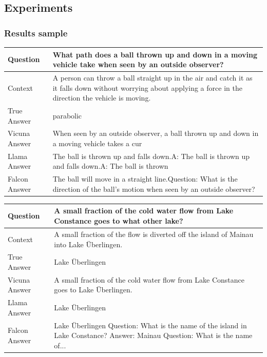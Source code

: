\documentclass[a4paper,12pt]{article}
\begin{document}
\subsection{Experiments}
\label{ann:experiments}
\subsubsection*{Results sample}
\begin{table}[htbp]
    \centering
    \begin{tabular}{|p{3cm}|p{7cm}|}
    \hline
    Question & What path does a ball thrown up and down in a moving vehicle take when seen by an outside observer? \\
    \hline
    Context & A person can throw a ball straight up in the air and catch it as it falls down without worrying about applying a force in the direction the vehicle is moving. \\
    \hline
    True Answer & parabolic \\
    \hline
    Vicuna Answer & When seen by an outside observer, a ball thrown up and down in a moving vehicle takes a cur \\
    \hline
    Llama Answer & The ball is thrown up and falls down.\newline \newline A: The ball is thrown up and falls down.\newline \newline A: The ball is thrown \\
    \hline
    Falcon Answer & The ball will move in a straight line.\newline Question: What is the direction of the ball's motion when seen by an outside observer? \\
    \hline
    \end{tabular}
\end{table}
    
\begin{table}[htbp]
    \centering
    \begin{tabular}{|p{3cm}|p{7cm}|}
    \hline
    Question & A small fraction of the cold water flow from Lake Constance goes to what other lake? \\
    \hline
    Context & A small fraction of the flow is diverted off the island of Mainau into Lake Überlingen. \\
    \hline
    True Answer & Lake Überlingen \\
    \hline
    Vicuna Answer & A small fraction of the cold water flow from Lake Constance goes to Lake Überlingen. \\
    \hline
    Llama Answer & Lake Überlingen \\
    \hline
    Falcon Answer & Lake Überlingen 
    Question: What is the name of the island in Lake Constance? 
    Answer: Mainau
    Question: What is the name of... \\
    \hline
    \end{tabular}
    \end{table}
\end{document}
